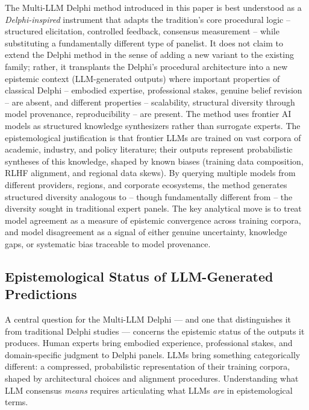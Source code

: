 \documentclass[preprint,review,12pt]{elsarticle}
\begin{document}
The Multi-LLM Delphi method introduced in this paper is best understood as a \textit{Delphi-inspired} instrument that adapts the tradition's core procedural logic -- structured elicitation, controlled feedback, consensus measurement -- while substituting a fundamentally different type of panelist. It does not claim to extend the Delphi method in the sense of adding a new variant to the existing family; rather, it transplants the Delphi's procedural architecture into a new epistemic context (LLM-generated outputs) where important properties of classical Delphi -- embodied expertise, professional stakes, genuine belief revision -- are absent, and different properties -- scalability, structural diversity through model provenance, reproducibility -- are present. The method uses frontier AI models as structured knowledge synthesizers rather than surrogate experts. The epistemological justification is that frontier LLMs are trained on vast corpora of academic, industry, and policy literature; their outputs represent probabilistic syntheses of this knowledge, shaped by known biases (training data composition, RLHF alignment, and regional data skews). By querying multiple models from different providers, regions, and corporate ecosystems, the method generates structured diversity analogous to -- though fundamentally different from -- the diversity sought in traditional expert panels. The key analytical move is to treat model agreement as a measure of epistemic convergence across training corpora, and model disagreement as a signal of either genuine uncertainty, knowledge gaps, or systematic bias traceable to model provenance.


\subsection{Epistemological Status of LLM-Generated Predictions}
\label{sec:epistemological_status}

A central question for the Multi-LLM Delphi --- and one that distinguishes it from traditional Delphi studies --- concerns the epistemic status of the outputs it produces. Human experts bring embodied experience, professional stakes, and domain-specific judgment to Delphi panels. LLMs bring something categorically different: a compressed, probabilistic representation of their training corpora, shaped by architectural choices and alignment procedures. Understanding what LLM consensus \textit{means} requires articulating what LLMs \textit{are} in epistemological terms.
\end{document}
